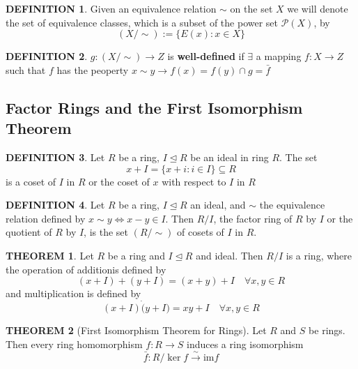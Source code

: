 \documentclass[12pt]{article}
\theoremstyle{definition}
\newtheorem{definition}{DEFINITION}[subsection]
\newtheorem{theorem}{THEOREM}[subsection]
\begin{document}
\begin{definition}
    Given an equivalence relation $\sim$ on the set $X$ we will denote the set of equivalence classes, which is a subset of the power set $\mathcal{P}(X)$, by $$(X/\sim) := \{E(x):x\in X\}$$
\end{definition}

\begin{definition}
    $g:(X/\sim) \rightarrow Z$ is \textbf{well-defined} if $\exists$ a mapping $f:X \rightarrow Z$ such that $f$ has the peoperty $x \sim y \rightarrow f(x) = f(y) \cap g = \bar{f}$ 
\end{definition}


\subsection{Factor Rings and the First Isomorphism Theorem}
\begin{definition}
    Let $R$ be a ring, $I \trianglelefteq R$ be an ideal in ring $R$. The set $$x + I = \{x+i:i\in I\}\subseteq R$$ is a coset of $I$ in $R$ or the coset of $x$ with respect to $I$ in $R$
\end{definition}

\begin{definition}
    Let $R$ be a ring, $I \trianglelefteq R$ an ideal, and $\sim$ the equivalence relation defined by $x \sim y \Leftrightarrow x - y \in I$. Then $R/I$, the factor ring of $R$ by $I$ or the quotient of $R$ by $I$, is the set $(R/ \sim)$ of cosets of $I$ in $R$.
\end{definition}

\begin{theorem}
    Let $R$ be a ring and $I \trianglelefteq R$ and ideal. Then $R/I$ is a ring, where the operation of additionis defined by
    $$(x+I)+(y+I) = (x+y) + I \quad \forall x, y \in R$$
    and multiplication is defined by
    $$(x + I)\dot(y+I) = xy + I \quad \forall x,y \in R$$
\end{theorem}

\begin{theorem}[First Isomorphism Theorem for Rings]
    Let $R$ and $S$ be rings. Then every ring homomorphism $f:R\longrightarrow S$ induces a ring isomorphism
    $$\bar{f}:R/\ker f \stackrel{\sim}{\rightarrow} \text{im} f$$
\end{theorem}


\end{document}
